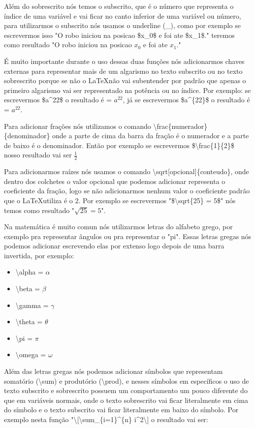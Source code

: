 Além do sobrescrito nós temos o subscrito, que é o número que representa o índice de uma variável e vai ficar no canto inferior de uma variável ou número, para utilizarmos o subscrito nós usamos o underline (\_), como por exemplo se escrevermos isso "O robo iniciou na posicao \$x\_0\$ e foi ate \$x\_1\$." teremos como resultado "O robo iniciou na posicao $x_0$ e foi ate $x_1$."

É muito importante durante o uso dessas duas funções nós adicionarmos chaves externas para representar mais de um algarismo no texto subscrito ou no texto sobrescrito porque se não o \LaTeX não vai subentender por padrão que apenas o primeiro algarismo vai ser representado na potência ou no índice. Por exemplo: se escrevermos \$a\^{}22\$ o resultado é = $a^22$, já se escrevermos \$a\^{}\{22\}\$ o resultado é = $a^{22}$.

Para adicionar frações nós utilizamos o comando \textbackslash frac\{numerador\}\{denominador\} onde a parte de cima da barra da fração é o numerador e a parte de baixo é o denominador. Então por exemplo se escrevermos \$\textbackslash frac\{1\}\{2\}\$ nosso resultado vai ser $\frac{1}{2}$

Para adicionarmos raízes nós usamos o comando \textbackslash sqrt[opcional]\{conteudo\}, onde dentro dos colchetes o valor opcional que podemos adicionar representa o coeficiente da fração, logo se não adicionarmos nenhum valor o coeficiente padrão que o \LaTeX utiliza é o 2. Por exemplo se escrevermos "\$\textbackslash sqrt\{25\} = 5\$" nós temos como resultado "$\sqrt{25} = 5$".

Na matemática é muito comun nós utilizarmos letras do alfabeto grego, por exemplo pra representar ângulos ou pra representar o "pi". Essas letras gregas nós podemos adicionar escrevendo elas por extenso logo depois de uma barra invertida, por exemplo:

\begin{itemize}
    \item \textbackslash alpha = $\alpha$
    \item \textbackslash beta = $\beta$
    \item \textbackslash gamma = $\gamma$
    \item \textbackslash theta = $\theta$
    \item \textbackslash pi = $\pi$
    \item \textbackslash omega = $\omega$
\end{itemize}

Além das letras gregas nós podemos adicionar símbolos que representam somatório (\textbackslash sum) e produtório (\textbackslash prod), e nesses símbolos em específicos o uso de texto subscrito e sobrescrito possuem um comportamento um pouco diferente do que em variáveis normais, onde o texto sobrescrito vai ficar literalmente em cima do símbolo e o texto subscrito vai ficar literalmente em baixo do símbolo. Por exemplo nesta função "\textbackslash[\textbackslash sum\_\{i=1\}\^{}\{n\} i\^{}2\textbackslash] o resultado vai ser:

